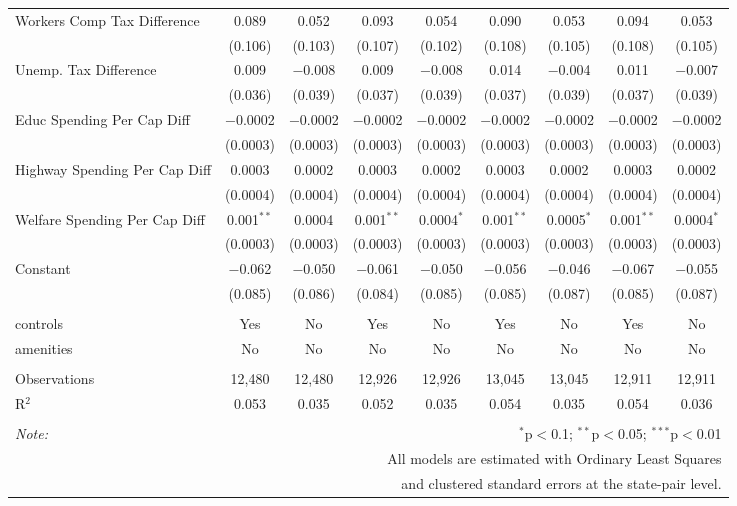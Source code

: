 \begin{table}[!htbp]
\begin{tabular}{@{\extracolsep{5pt}}lcccccccc}
  Workers Comp Tax Difference & 0.089 & 0.052 & 0.093 & 0.054 & 0.090 & 0.053 & 0.094 & 0.053 \\ 
  & (0.106) & (0.103) & (0.107) & (0.102) & (0.108) & (0.105) & (0.108) & (0.105) \\ 
  Unemp. Tax Difference & 0.009 & $-$0.008 & 0.009 & $-$0.008 & 0.014 & $-$0.004 & 0.011 & $-$0.007 \\ 
  & (0.036) & (0.039) & (0.037) & (0.039) & (0.037) & (0.039) & (0.037) & (0.039) \\ 
  Educ Spending Per Cap Diff & $-$0.0002 & $-$0.0002 & $-$0.0002 & $-$0.0002 & $-$0.0002 & $-$0.0002 & $-$0.0002 & $-$0.0002 \\ 
  & (0.0003) & (0.0003) & (0.0003) & (0.0003) & (0.0003) & (0.0003) & (0.0003) & (0.0003) \\ 
  Highway Spending Per Cap Diff & 0.0003 & 0.0002 & 0.0003 & 0.0002 & 0.0003 & 0.0002 & 0.0003 & 0.0002 \\ 
  & (0.0004) & (0.0004) & (0.0004) & (0.0004) & (0.0004) & (0.0004) & (0.0004) & (0.0004) \\ 
  Welfare Spending Per Cap Diff & 0.001$^{**}$ & 0.0004 & 0.001$^{**}$ & 0.0004$^{*}$ & 0.001$^{**}$ & 0.0005$^{*}$ & 0.001$^{**}$ & 0.0004$^{*}$ \\ 
  & (0.0003) & (0.0003) & (0.0003) & (0.0003) & (0.0003) & (0.0003) & (0.0003) & (0.0003) \\ 
  Constant & $-$0.062 & $-$0.050 & $-$0.061 & $-$0.050 & $-$0.056 & $-$0.046 & $-$0.067 & $-$0.055 \\ 
  & (0.085) & (0.086) & (0.084) & (0.085) & (0.085) & (0.087) & (0.085) & (0.087) \\ 
 \hline \\[-1.8ex] 
controls & Yes & No & Yes & No & Yes & No & Yes & No \\ 
amenities & No & No & No & No & No & No & No & No \\ 
\hline \\[-1.8ex] 
Observations & 12,480 & 12,480 & 12,926 & 12,926 & 13,045 & 13,045 & 12,911 & 12,911 \\ 
R$^{2}$ & 0.053 & 0.035 & 0.052 & 0.035 & 0.054 & 0.035 & 0.054 & 0.036 \\ 
\hline 
\hline \\[-1.8ex] 
\textit{Note:}  & \multicolumn{8}{r}{$^{*}$p$<$0.1; $^{**}$p$<$0.05; $^{***}$p$<$0.01} \\ 
 & \multicolumn{8}{r}{All models are estimated with Ordinary Least Squares} \\ 
 & \multicolumn{8}{r}{and clustered standard errors at the state-pair level.} \\ 
\end{tabular} 
\end{table} 
